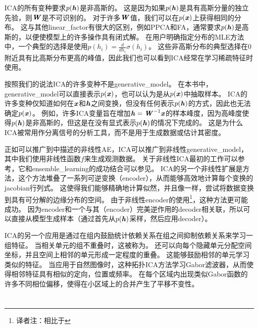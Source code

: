 \gls{ICA}的所有变种要求$p(\boldsymbol{\mathit{h}})$是非高斯的。
这是因为如果$p(\boldsymbol{\mathit{h}})$是具有高斯分量的独立先验，则$\boldsymbol{\mathit{W}}$是不可识别的。
对于许多$\boldsymbol{\mathit{W}}$值，我们可以在$p(\boldsymbol{\mathit{x}})$上获得相同的分布。 
这与其他\gls{linear_factor}有很大的区别，例如\gls{PPCA}和\gls{FA}，通常要求$p(\boldsymbol{\mathit{h}})$是高斯的，以便使模型上的许多操作具有闭式解。
在用户明确指定分布的\gls{MLE}方法中，一个典型的选择是使用$p(h_i) = \frac{d}{dh_i}\sigma(h_i)$。
这些非高斯分布的典型选择在$0$附近具有比高斯分布更高的峰值，因此我们也可以看到\gls{ICA}经常在学习稀疏特征时使用。




按照我们的说法\gls{ICA}的许多变种不是\gls{generative_model}。
 在本书中，\gls{generative_model}可以直接表示$p(\boldsymbol{\mathit{x}})$，也可以认为是从$p(\boldsymbol{\mathit{x}})$中抽取样本。
\gls{ICA}的许多变种仅知道如何在$\boldsymbol{\mathit{x}}$和$\boldsymbol{\mathit{h}}$之间变换，但没有任何表示$p(\boldsymbol{\mathit{h}})$的方式，因此也无法确定$p(\boldsymbol{\mathit{x}})$。
例如，许多\gls{ICA}变量旨在增加$\boldsymbol{\mathit{h}} = \boldsymbol{\mathit{W}}^{-1}\boldsymbol{\mathit{x}}$的样本峰度，因为高峰度使得$p(\boldsymbol{\mathit{h}})$是非高斯的，但这是在没有显式表示$p(\boldsymbol{\mathit{h}})$的情况下完成的。
这是为什么\gls{ICA}被常用作分离信号的分析工具，而不是用于生成数据或估计其密度。


正如可以推广到中描述的非线性\gls{AE}，\gls{ICA}可以推广到非线性\gls{generative_model}，其中我们使用非线性函数$f$来生成观测数据。
关于非线性\gls{ICA}最初的工作可以参考\citet{hyvarinen1999nonlinear}，它和\gls{ensemble_learning}的成功结合可以参见\citet{roberts2001independent,lappalainen2000nonlinear}。
\gls{ICA}的另一个非线性扩展是方法\citep{Dinh-et-al-arxiv2014}，这个方法堆叠了一系列可逆变换（\gls{encoder}），从而能够高效地计算每个变换的\gls{jacobian}行列式。
这使得我们能够精确地计算似然，并且像一样，尝试将数据变换到具有可分解的边缘分布的空间。
由于非线性\gls{encoder}的使用\footnote{译者注：相比于}，这种方法更可能成功。
因为\gls{encoder}和一个与其（\gls{encoder}）完美逆作用的\gls{decoder}相关联，所以可以直接从模型生成样本（通过首先从$p(\boldsymbol{\mathit{h}})$采样，然后应用\gls{decoder}）。


\gls{ICA}的另一个应用是通过在组内鼓励统计依赖关系在组之间抑制依赖关系来学习一组特征。
当相关单元的组不重叠时，这被称为。
还可以向每个隐藏单元分配空间坐标，并且空间上相邻的单元形成一定程度的重叠。
这能够鼓励相邻的单元学习类似的特征。
当应用于自然图像时，这种拓扑\gls{ICA}方法学习Gabor滤波器，从而使得相邻特征具有相似的定向，位置或频率。
在每个区域内出现类似Gabor函数的许多不同相位偏移，使得在小区域上的合并产生了平移不变性。


\section{}
\label{sec:slow_feature_analysis}


